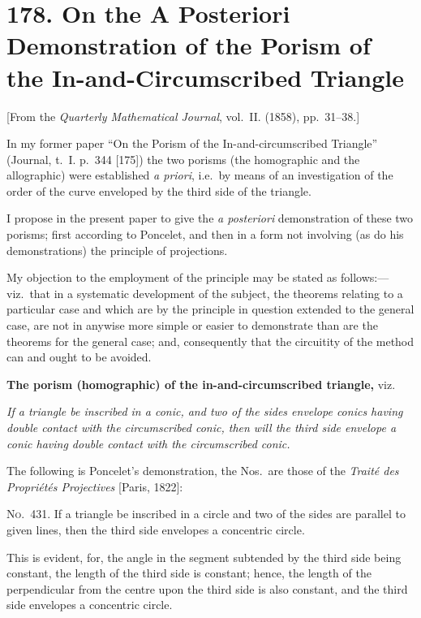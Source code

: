 \documentclass[11pt,a4paper]{book}
\begin{document}
\newpage
\section*{178. On the A Posteriori Demonstration of the Porism of the In-and-Circumscribed Triangle}

[From the \textit{Quarterly Mathematical Journal}, vol.~II. (1858), pp.~31--38.]

In my former paper ``On the Porism of the In-and-circumscribed Triangle'' (Journal, t.~I. p.~344 [175]) the two porisms (the homographic and the allographic) were established \textit{a priori}, i.e.\ by means of an investigation of the order of the curve enveloped by the third side of the triangle.

I propose in the present paper to give the \textit{a posteriori} demonstration of these two porisms; first according to Poncelet, and then in a form not involving (as do his demonstrations) the principle of projections.

My objection to the employment of the principle may be stated as follows:---viz.\ that in a systematic development of the subject, the theorems relating to a particular case and which are by the principle in question extended to the general case, are not in anywise more simple or easier to demonstrate than are the theorems for the general case; and, consequently that the circuitity of the method can and ought to be avoided.

\textbf{The porism (homographic) of the in-and-circumscribed triangle,} viz.

\textit{If a triangle be inscribed in a conic, and two of the sides envelope conics having double contact with the circumscribed conic, then will the third side envelope a conic having double contact with the circumscribed conic.}

The following is Poncelet's demonstration, the Nos.\ are those of the \textit{Trait\'{e} des Propri\'{e}t\'{e}s Projectives} [Paris, 1822]:

\textsc{No.~431.} If a triangle be inscribed in a circle and two of the sides are parallel to given lines, then the third side envelopes a concentric circle.

This is evident, for, the angle in the segment subtended by the third side being constant, the length of the third side is constant; hence, the length of the perpendicular from the centre upon the third side is also constant, and the third side envelopes a concentric circle.
\end{document}

